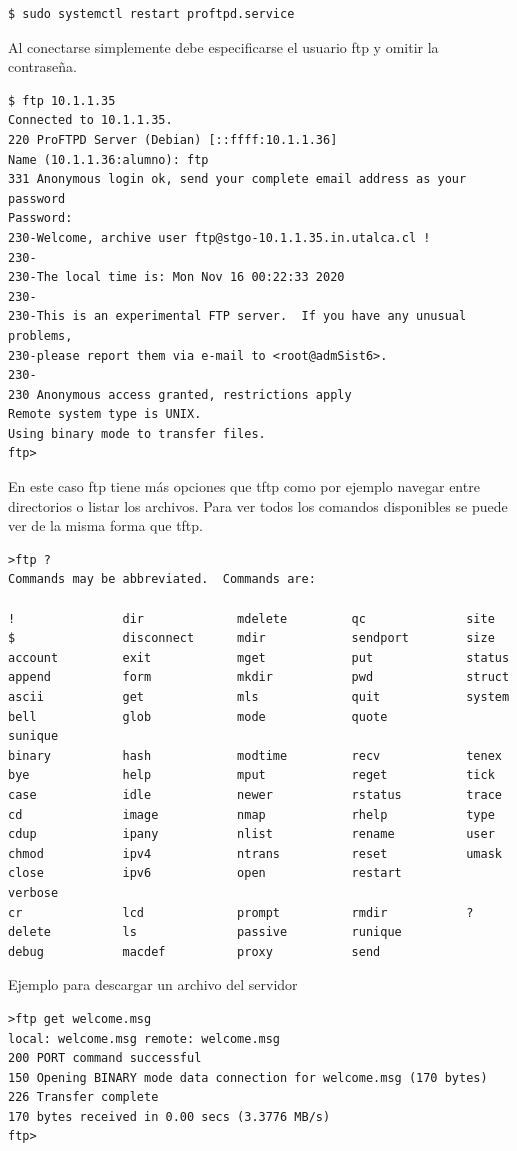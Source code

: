 \documentclass[12pt]{article}
\begin{document}
\begin{lstlisting}[frame=single]
$ sudo systemctl restart proftpd.service
\end{lstlisting}

Al conectarse simplemente debe especificarse el usuario ftp y omitir la contraseña.
\begin{lstlisting}[frame=single]
$ ftp 10.1.1.35
Connected to 10.1.1.35.
220 ProFTPD Server (Debian) [::ffff:10.1.1.36]
Name (10.1.1.36:alumno): ftp
331 Anonymous login ok, send your complete email address as your password
Password:
230-Welcome, archive user ftp@stgo-10.1.1.35.in.utalca.cl !
230-
230-The local time is: Mon Nov 16 00:22:33 2020
230-
230-This is an experimental FTP server.  If you have any unusual problems,
230-please report them via e-mail to <root@admSist6>.
230-
230 Anonymous access granted, restrictions apply
Remote system type is UNIX.
Using binary mode to transfer files.
ftp> 
\end{lstlisting}

En este caso ftp tiene más opciones que tftp como por ejemplo navegar entre directorios o listar los archivos. Para ver todos los comandos disponibles se puede ver de la misma forma que tftp.

\begin{lstlisting}[frame=single]
>ftp ?
Commands may be abbreviated.  Commands are:

!               dir             mdelete         qc              site
$               disconnect      mdir            sendport        size
account         exit            mget            put             status
append          form            mkdir           pwd             struct
ascii           get             mls             quit            system
bell            glob            mode            quote           sunique
binary          hash            modtime         recv            tenex
bye             help            mput            reget           tick
case            idle            newer           rstatus         trace
cd              image           nmap            rhelp           type
cdup            ipany           nlist           rename          user
chmod           ipv4            ntrans          reset           umask
close           ipv6            open            restart         verbose
cr              lcd             prompt          rmdir           ?
delete          ls              passive         runique
debug           macdef          proxy           send
\end{lstlisting}
\break
Ejemplo para descargar un archivo del servidor
\begin{lstlisting}[frame=single]
>ftp get welcome.msg
local: welcome.msg remote: welcome.msg
200 PORT command successful
150 Opening BINARY mode data connection for welcome.msg (170 bytes)
226 Transfer complete
170 bytes received in 0.00 secs (3.3776 MB/s)
ftp>
\end{lstlisting}
\end{document}

